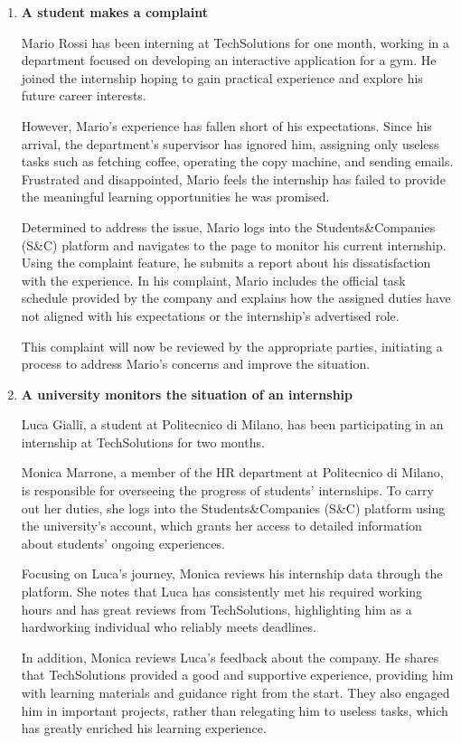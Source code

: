 \begin{enumerate}
    \item \textbf{A student makes a complaint}

    Mario Rossi has been interning at TechSolutions for one month, working in a department focused on developing an interactive application for a gym. He joined the internship hoping to gain practical experience and explore his future career interests.

    However, Mario’s experience has fallen short of his expectations. Since his arrival, the department’s supervisor has ignored him, assigning only useless tasks such as fetching coffee, operating the copy machine, and sending emails. Frustrated and disappointed, Mario feels the internship has failed to provide the meaningful learning opportunities he was promised.

    Determined to address the issue, Mario logs into the Students\&Companies (S\&C) platform and navigates to the page to monitor his current internship. Using the complaint feature, he submits a report about his dissatisfaction with the experience. In his complaint, Mario includes the official task schedule provided by the company and explains how the assigned duties have not aligned with his expectations or the internship’s advertised role.

    This complaint will now be reviewed by the appropriate parties, initiating a process to address Mario’s concerns and improve the situation.


    \item \textbf{A university monitors the situation of an internship}
    
    Luca Gialli, a student at Politecnico di Milano, has been participating in an internship at TechSolutions for two months.

    Monica Marrone, a member of the HR department at Politecnico di Milano, is responsible for overseeing the progress of students' internships. To carry out her duties, she logs into the Students\&Companies (S\&C) platform using the university's account, which grants her access to detailed information about students’ ongoing experiences.

    Focusing on Luca’s journey, Monica reviews his internship data through the platform. She notes that Luca has consistently met his required working hours and has great reviews from TechSolutions, highlighting him as a hardworking individual who reliably meets deadlines.

    In addition, Monica reviews Luca’s feedback about the company. He shares that TechSolutions provided a good and supportive experience, providing him with learning materials and guidance right from the start. They also engaged him in important projects, rather than relegating him to useless tasks, which has greatly enriched his learning experience.


\end{enumerate}
